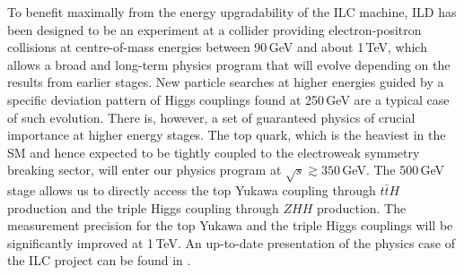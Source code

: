 To benefit maximally from the energy upgradability of the ILC machine, ILD has been designed to be an experiment at a collider providing electron-positron collisions at centre-of-mass energies between 90\,GeV and about 1\,TeV, which allows a broad and long-term physics program that will evolve depending on the results from earlier stages. New particle searches at higher energies guided by a specific deviation pattern of Higgs couplings found at 250\,GeV are a typical case of such evolution. There is, however, a set of guaranteed physics of crucial importance at higher energy stages. The top quark, which is the heaviest in the SM and hence expected to be tightly coupled to the electroweak symmetry breaking sector, will enter our physics program at $\sqrt{s} \gtrsim 350$\,GeV. The 500\,GeV stage allows us to directly access the top Yukawa coupling through $t\bar{t}H$ production and the triple Higgs coupling through $ZHH$ production. The measurement precision for the top Yukawa and the triple Higgs couplings will be significantly improved at 1\,TeV. An up-to-date presentation of the physics case of the ILC project can be found in
\cite{Ref:ILCESU1}.
%
